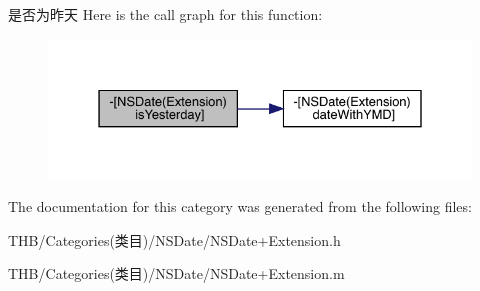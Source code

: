 是否为昨天 Here is the call graph for this function\+:\nopagebreak
\begin{figure}[H]
\begin{center}
\leavevmode
\includegraphics[width=331pt]{category_n_s_date_07_extension_08_af5ff9da017719ae7291510bd099f95c3_cgraph}
\end{center}
\end{figure}


The documentation for this category was generated from the following files\+:\begin{DoxyCompactItemize}
\item 
T\+H\+B/\+Categories(类目)/\+N\+S\+Date/N\+S\+Date+\+Extension.\+h\item 
T\+H\+B/\+Categories(类目)/\+N\+S\+Date/N\+S\+Date+\+Extension.\+m\end{DoxyCompactItemize}
